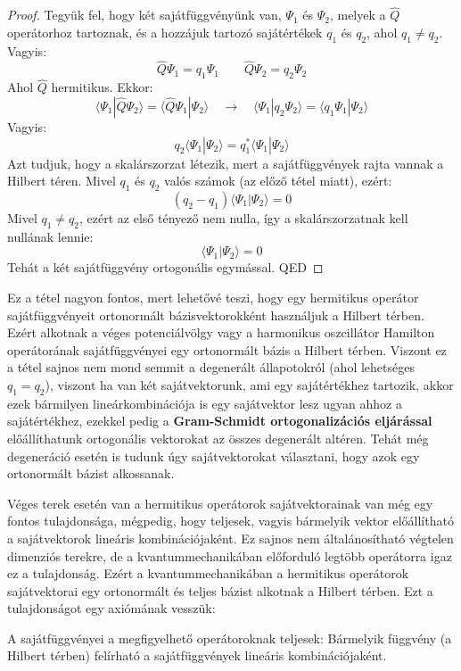 \documentclass[../main.tex]{subfiles}
\begin{document}
\begin{proof}
    Tegyük fel, hogy két sajátfüggvényünk van, $\Psi_1$ és $\Psi_2$, melyek a $\hat{Q}$ operátorhoz tartoznak, és a hozzájuk tartozó sajátértékek $q_1$ és $q_2$, ahol $q_1 \neq q_2$.
    Vagyis:
    \begin{equation}
        \hat{Q} \Psi_1 = q_1 \Psi_1 \qquad \hat{Q} \Psi_2 = q_2 \Psi_2
    \end{equation}
    Ahol $\hat{Q}$ hermitikus. Ekkor:
    \begin{equation}
        \langle \Psi_1 | \hat{Q} \Psi_2 \rangle = \langle \hat{Q} \Psi_1 | \Psi_2 \rangle \quad \rightarrow \quad \langle \Psi_1 | q_2 \Psi_2 \rangle = \langle q_1 \Psi_1 | \Psi_2 \rangle
    \end{equation}
    Vagyis:
    \begin{equation}
        q_2 \langle \Psi_1 | \Psi_2 \rangle = q^*_1 \langle \Psi_1 | \Psi_2 \rangle
    \end{equation}
    Azt tudjuk, hogy a skalárszorzat létezik, mert a sajátfüggvények rajta vannak a Hilbert téren. Mivel $q_1$ és $q_2$ valós számok (az előző tétel miatt), ezért:
    \begin{equation}
        (q_2 - q_1) \langle \Psi_1 | \Psi_2 \rangle = 0
    \end{equation}
    Mivel $q_1 \neq q_2$, ezért az első tényező nem nulla, így a skalárszorzatnak kell nullának lennie:
    \begin{equation}
        \langle \Psi_1 | \Psi_2 \rangle = 0
    \end{equation}
    Tehát a két sajátfüggvény ortogonális egymással. QED
\end{proof}
Ez a tétel nagyon fontos, mert lehetővé teszi, hogy egy hermitikus operátor sajátfüggvényeit ortonormált bázisvektorokként használjuk a Hilbert térben. Ezért alkotnak a véges potenciálvölgy vagy a harmonikus oszcillátor
Hamilton operátorának sajátfüggvényei egy ortonormált bázis a Hilbert térben. Viszont ez a tétel sajnos nem mond semmit a degenerált állapotokról (ahol lehetséges $q_1 = q_2$), viszont ha van két sajátvektorunk,
ami egy sajátértékhez tartozik, akkor ezek bármilyen lineárkombinációja is egy sajátvektor lesz ugyan ahhoz a sajátértékhez, ezekkel pedig a \textbf{Gram-Schmidt ortogonalizációs eljárással} előállíthatunk ortogonális vektorokat az összes degenerált altéren.
Tehát még degeneráció esetén is tudunk úgy sajátvektorokat választani, hogy azok egy ortonormált bázist alkossanak.

Véges terek esetén van a hermitikus operátorok sajátvektorainak van még egy fontos tulajdonsága, mégpedig, hogy teljesek, vagyis bármelyik vektor előállítható a sajátvektorok lineáris kombinációjaként.
Ez sajnos nem általánosítható végtelen dimenziós terekre, de a kvantummechanikában előforduló legtöbb operátorra igaz ez a tulajdonság. Ezért a kvantummechanikában a hermitikus operátorok sajátvektorai
egy ortonormált és teljes bázist alkotnak a Hilbert térben. Ezt a tulajdonságot egy axiómának vesszük:
\begin{axiom}
    A sajátfüggvényei a megfigyelhető operátoroknak teljesek: Bármelyik függvény (a Hilbert térben) felírható a sajátfüggvények lineáris kombinációjaként.
\end{axiom}
\end{document}
